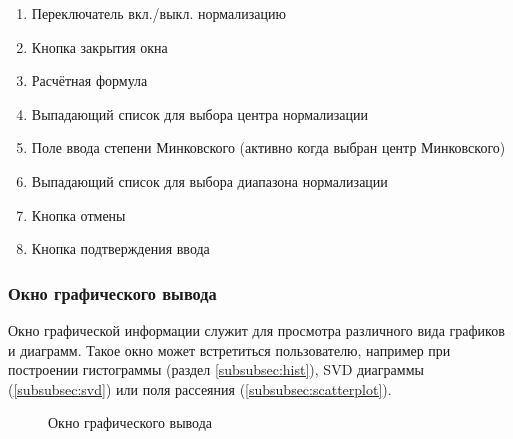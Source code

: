 \documentclass[12pt,tikz]{instruction}
\begin{document}
\begin{enumerate}
	\item Переключатель вкл./выкл. нормализацию
	\item Кнопка закрытия окна
	\item Расчётная формула
	\item Выпадающий список для выбора центра нормализации
	\item Поле ввода степени Минковского (активно когда выбран центр Минковского)
	\item Выпадающий список для выбора диапазона нормализации
	\item Кнопка отмены
	\item Кнопка подтверждения ввода
\end{enumerate}

\subsubsection{Окно графического вывода}
\label{subsec:plot-view}
Окно графической информации служит для просмотра различного вида графиков и диаграмм. Такое окно может встретиться пользователю, например при построении гистограммы (раздел \ref{subsubsec:hist}), SVD диаграммы (\ref{subsubsec:svd}) или поля рассеяния (\ref{subsubsec:scatterplot}).

\begin{figure}[H]
	\centering
	\caption{Окно графического вывода}
	\label{fig:plot-view}
\end{figure}
\end{document}
